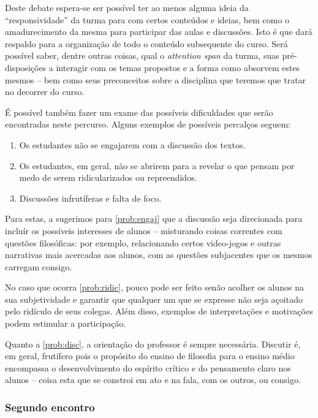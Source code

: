 \documentclass[12pt,a4paper]{article}
\begin{document}
	Deste debate espera-se ser possível ter ao menos alguma ideia da 
	``responsividade'' da turma para com certos conteúdos e ideias, 
	bem como o amadurecimento da mesma para participar das aulas 
	e discussões. Isto é que dará respaldo para a organização de 
	todo o conteúdo subsequente do curso. Será possível saber, dentre 
	outras coisas, qual o \emph{attention span} da turma, suas 
	pré-disposições a interagir com os temas propostos e a forma 
	como absorvem estes mesmos -- bem como seus preconceitos sobre 
	a disciplina que teremos que tratar no decorrer do curso. 
	
	É possível também fazer um exame das possíveis dificuldades 
	que serão encontradas neste percurso. Alguns exemplos de possíveis 
	percalços seguem:

	\begin{enumerate}[label=\alph*)]
		\item	\label{prob:engaj} 
			Os estudantes não se engajarem com a discussão 
			dos textos.

		\item	\label{prob:ridic}
			Os estudantes, em geral, não se abrirem para a 
			revelar o que pensam por medo de serem ridicularizados
			ou repreendidos.

		\item	\label{prob:disc}
			Discussões infrutíferas e falta de foco.
	\end{enumerate}
	
	Para estas, a sugerimos para \ref{prob:engaj} que a discussão
	seja direcionada para incluír os possíveis interesses de alunos
	-- misturando coisas correntes com questões filosóficas: por
	exemplo, relacionando certos video-jogos e outras narrativas 
	mais acercadas aos alunos, com as questões subjacentes que os 
	mesmos carregam consigo. 
	
	No caso que ocorra \ref{prob:ridic}, pouco pode ser feito senão
	acolher os alunos na sua subjetividade e garantir que qualquer 
	um que se expresse não seja açoitado pelo ridículo de seus 
	colegas. Além disso, exemplos de interpretações e motivações 
	podem estimular a participação.

	Quanto a \ref{prob:disc}, a orientação do professor é sempre
	necessária. Discutir é, em geral, frutífero pois o propósito
	do ensino de filosofia para o ensino médio encompassa o 
	desenvolvimento do espírito crítico e do pensamento claro nos 
	alunos -- coisa esta que se constroi em ato e na fala, com os 
	outros, ou consigo.

	\subsubsection{Segundo encontro}
\end{document}
